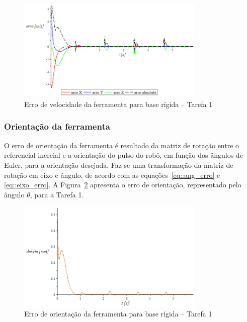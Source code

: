 \begin{figure}[h!]
	\centering 
 	\includegraphics[width=0.80\textwidth]{figs/t1_errovelf_base_rig}
 	\caption{Erro de velocidade da ferramenta para base rígida --
 	Tarefa 1}
 	\label{fig::t1_errovelf_base_rig}
\end{figure}


\subsubsection{Orientação da ferramenta}

O erro de orientação da ferramenta é resultado da matriz de rotação entre o
referencial inercial e a orientação do pulso do robô, em função dos ângulos de
Euler, para a orientação desejada. Faz-se uma transformação da matriz de rotação
em eixo e ângulo, de acordo com as equações~\ref{eq::ang_erro} e
\ref{eq::eixo_erro}. A Figura~\ref{fig::t1_erroori_base_rig} apresenta o
erro de orientação, representado pelo ângulo $\theta$, para a Tarefa 1.

\begin{figure}[h!]
	\centering 
 	\includegraphics[width=0.80\textwidth]{figs/t1_erroori_base_rig}
 	\caption{Erro de orientação da ferramenta para base rígida -- Tarefa
 	1}
 	\label{fig::t1_erroori_base_rig}
\end{figure}



